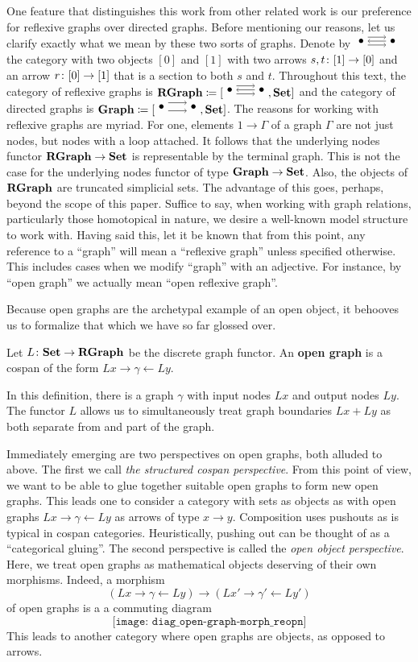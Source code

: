 \documentclass[master_reopn]{subfiles}
\begin{document}
One feature that distinguishes this work from other related work is our preference for reflexive graphs over directed graphs.  Before mentioning our reasons, let us clarify exactly what we mean by these two sorts of graphs. Denote by $ \rgraph{\bullet}{\bullet} $ the category with two objects $ [0] $ and $ [1] $ with two arrows $ s,t \colon [1] \to [0] $ and an arrow $ r \colon [0] \to [1] $ that is a section to both $ s $ and $ t $.  Throughout this text, the category of reflexive graphs is $ \RGraph \coloneqq [ \rgraph{\bullet}{\bullet} , \Set] $ and the category of directed graphs is $ \Graph \coloneqq [ \graph{\bullet}{\bullet} , \Set ] $.  The reasons for working with reflexive graphs are myriad.  For one, elements $ 1 \to \Gamma $ of a graph $ \Gamma $ are not just nodes, but nodes with a loop attached.  It follows that the underlying nodes functor $ \mathbf{RGraph} \to \mathbf{Set} $ is representable by the terminal graph. This is not the case for the underlying nodes functor of type $ \mathbf{Graph} \to \mathbf{Set} $.  Also, the objects of $ \mathbf{RGraph} $ are truncated simplicial sets. The advantage of this goes, perhaps, beyond the scope of this paper. Suffice to say, when working with graph relations, particularly those homotopical in nature, we desire a well-known model structure to work with.  Having said this, let it be known that from this point, any reference to a ``graph'' will mean a ``reflexive graph'' unless specified otherwise. This includes cases when we modify ``graph'' with an adjective. For instance, by ``open graph'' we actually mean ``open reflexive graph''.

Because open graphs are the archetypal example of an open object, it behooves us to formalize that which we have so far glossed over. 

\begin{df} \label{df:OpenGraph}
	Let $ L \colon \mathbf{Set} \to \mathbf{RGraph} $ be the discrete graph functor.  An \textbf{open graph} is a cospan of the form $ L x \to \gamma \gets L y $.  
\end{df}

In this definition, there is a graph $ \gamma $ with input nodes $ Lx $ and output nodes $ Ly $.  The functor $ L $ allows us to simultaneously treat graph boundaries $ Lx + Ly $ as both separate from and part of the graph.  

Immediately emerging are two perspectives on open graphs, both alluded to above. The first we call \emph{the structured cospan perspective}. From this point of view, we want to be able to glue together suitable open graphs to form new open graphs. This leads one to consider a category with sets as objects as with open graphs $ Lx \to \gamma \gets Ly $ as arrows of type $ x \to y $.  Composition uses pushouts as is typical in cospan categories.
Heuristically, pushing out can be thought of as a ``categorical gluing''. 
 The second perspective is called the \emph{open object perspective}.  Here, we treat open graphs as mathematical objects deserving of their own morphisms.  Indeed, a morphism 
\[
(L x \to \gamma \gets L y) \to ( L x' \to \gamma' \gets L y' )
\]
of open graphs is a a commuting diagram
\[
\texttt{[image: diag\_open-graph-morph\_reopn]}
\]
This leads to another category where open graphs are objects, as opposed to arrows.  
\end{document}
